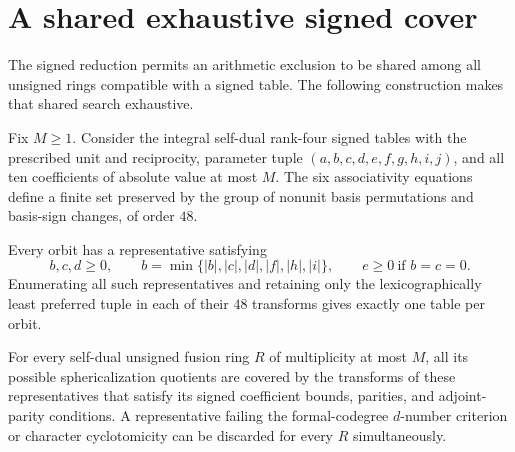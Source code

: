 \section{A shared exhaustive signed cover}\label{sec:shared-signed-cover}
The signed reduction permits an arithmetic exclusion to be shared among
all unsigned rings compatible with a signed table. The following
construction makes that shared search exhaustive.

\begin{proposition}
\label{prop:global-signed-cover}
Fix $M\geq1$. Consider the integral self-dual rank-four signed tables
with the prescribed unit and reciprocity, parameter tuple
$(a,b,c,d,e,f,g,h,i,j)$, and all ten coefficients of absolute value
at most $M$. The six associativity equations define a finite set
preserved by the group of nonunit basis permutations and basis-sign
changes, of order $48$.

Every orbit has a representative satisfying
\[
 b,c,d\geq0,\qquad
 b=\min\{|b|,|c|,|d|,|f|,|h|,|i|\},
 \qquad e\geq0\ \text{if }b=c=0.
\]
Enumerating all such representatives and retaining only the
lexicographically least preferred tuple in each of their $48$
transforms gives exactly one table per orbit.

For every self-dual unsigned fusion ring $R$ of multiplicity at
most $M$, all its possible sphericalization quotients are covered
by the transforms of these representatives that satisfy its signed
coefficient bounds, parities, and adjoint-parity conditions.
A representative failing the formal-codegree $d$-number criterion
or character cyclotomicity can be discarded for every $R$
simultaneously.
\end{proposition}

